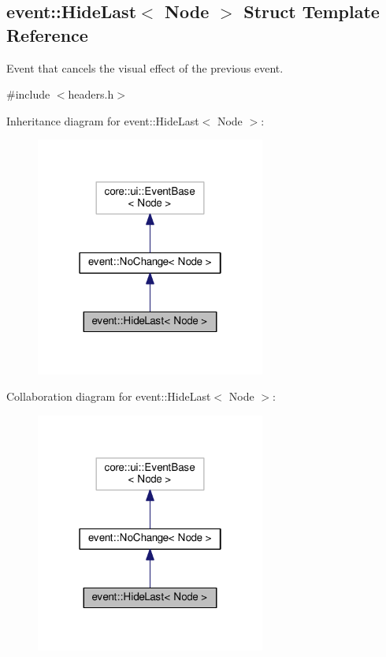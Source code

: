 \hypertarget{structevent_1_1HideLast}{}\subsection{event\+:\+:Hide\+Last$<$ Node $>$ Struct Template Reference}
\label{structevent_1_1HideLast}


Event that cancels the visual effect of the previous event.  




{\ttfamily \#include $<$headers.\+h$>$}



Inheritance diagram for event\+:\+:Hide\+Last$<$ Node $>$\+:\nopagebreak
\begin{figure}[H]
\begin{center}
\leavevmode
\includegraphics[width=214pt]{structevent_1_1HideLast__inherit__graph}
\end{center}
\end{figure}


Collaboration diagram for event\+:\+:Hide\+Last$<$ Node $>$\+:\nopagebreak
\begin{figure}[H]
\begin{center}
\leavevmode
\includegraphics[width=214pt]{structevent_1_1HideLast__coll__graph}
\end{center}
\end{figure}
